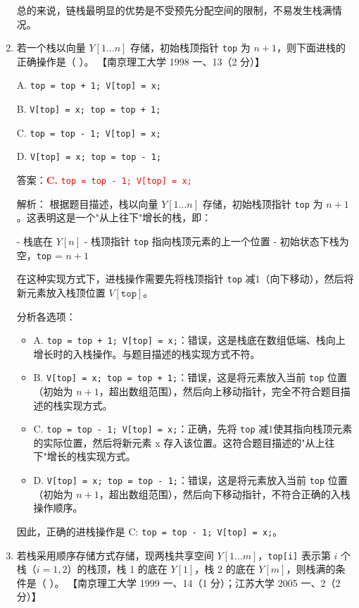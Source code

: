 \documentclass[lang=cn,newtx,10pt,scheme=chinese]{../../../elegantbook}
\begin{document}
\begin{enumerate}
    总的来说，链栈最明显的优势是不受预先分配空间的限制，不易发生栈满情况。

    \item 若一个栈以向量 $Y[1 \ldots n]$ 存储，初始栈顶指针 \texttt{top} 为 $n+1$，则下面进栈的正确操作是（ ）。  
    【南京理工大学 1998 一、13（2 分）】  

    A. \texttt{top = top + 1; V[top] = x;}  

    B. \texttt{V[top] = x; top = top + 1;}  

    C. \texttt{top = top - 1; V[top] = x;}  

    D. \texttt{V[top] = x; top = top - 1;}  

    答案：\textcolor{red}{\textbf{C.} \texttt{top = top - 1; V[top] = x;}}

    解析：
    根据题目描述，栈以向量 $Y[1 \ldots n]$ 存储，初始栈顶指针 \texttt{top} 为 $n+1$。这表明这是一个"从上往下"增长的栈，即：
    
    - 栈底在 $Y[n]$
    - 栈顶指针 \texttt{top} 指向栈顶元素的上一个位置
    - 初始状态下栈为空，\texttt{top} = $n+1$
    
    在这种实现方式下，进栈操作需要先将栈顶指针 \texttt{top} 减1（向下移动），然后将新元素放入栈顶位置 $V[\texttt{top}]$。

    分析各选项：
    \begin{itemize}
        \item A. \texttt{top = top + 1; V[top] = x;}：错误，这是栈底在数组低端、栈向上增长时的入栈操作。与题目描述的栈实现方式不符。
        
        \item B. \texttt{V[top] = x; top = top + 1;}：错误，这是将元素放入当前 \texttt{top} 位置（初始为 $n+1$，超出数组范围），然后向上移动指针，完全不符合题目描述的栈实现方式。
        
        \item C. \texttt{top = top - 1; V[top] = x;}：正确，先将 \texttt{top} 减1使其指向栈顶元素的实际位置，然后将新元素 x 存入该位置。这符合题目描述的"从上往下"增长的栈实现方式。
        
        \item D. \texttt{V[top] = x; top = top - 1;}：错误，这是将元素放入当前 \texttt{top} 位置（初始为 $n+1$，超出数组范围），然后向下移动指针，不符合正确的入栈操作顺序。
    \end{itemize}

    因此，正确的进栈操作是 C: \texttt{top = top - 1; V[top] = x;}。

    \item 若栈采用顺序存储方式存储，现两栈共享空间 $Y[1 \ldots m]$，\texttt{top[i]} 表示第 $i$ 个栈（$i=1, 2$）的栈顶，栈 1 的底在 $Y[1]$，栈 2 的底在 $Y[m]$，则栈满的条件是（ ）。  
    【南京理工大学 1999 一、14（1 分）；江苏大学 2005 一、2（2 分）】  


\end{enumerate}
\end{document}
